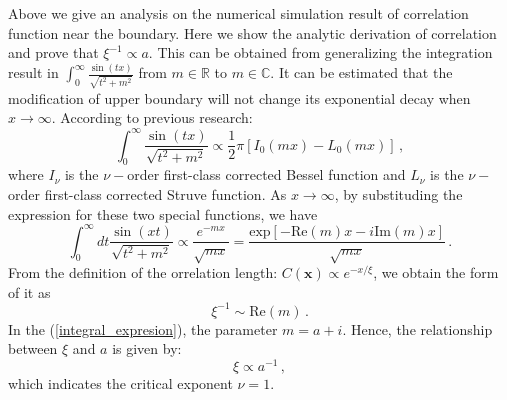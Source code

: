 \documentclass[aps,onecolumn,nofootinbib,superscriptaddress,notitlepage,longbibliography]{revtex4-1}
\begin{document}
Above we give an analysis on the numerical simulation result of correlation
function near the boundary. Here we show the analytic derivation of
correlation and prove that $\xi^{-1}\propto a$. This can be obtained
from generalizing the integration result in $\int_{0}^{\infty}\frac{\sin(tx)}{\sqrt{t^{2}+m^{2}}}$
from $m\in\mathbb{R}$ to $m\in\mathbb{C}$. It can be estimated that
the modification of upper boundary will not change its exponential
decay when $x\to\infty$. According to previous research: 
\begin{equation}
\int_{0}^{\infty}\frac{\sin(tx)}{\sqrt{t^{2}+m^{2}}}\propto\frac{1}{2}\pi[I_{0}(mx)-L_{0}(mx)]\,,
\end{equation}
where $I_{\nu}$ is the $\nu-$order first-class corrected Bessel
function and $L_{\nu}$ is the $\nu-$order first-class corrected
Struve function. As $x\to\infty$, by substituding the expression
for these two special functions, we have 
\begin{equation}
\int_{0}^{\infty}dt\frac{\sin(xt)}{\sqrt{t^{2}+m^{2}}}\propto\frac{e^{-mx}}{\sqrt{mx}}=\frac{\text{exp}[-\text{Re}(m)x-i\text{Im}(m)x]}{\sqrt{mx}}\,.
\end{equation}
From the definition of the orrelation length: $C(\bm{x})\propto e^{-x/\xi}$,
we obtain the form of it as 
\begin{equation}
\xi^{-1}\sim\text{Re}(m)\,.
\end{equation}
In the (\ref{integral_expresion}), the parameter $m=a+i$. Hence,
the relationship between $\xi$ and $a$ is given by: 
\begin{equation}
\xi\propto a^{-1}\,,
\end{equation}
which indicates the critical exponent $\nu=1$.
\end{document}
